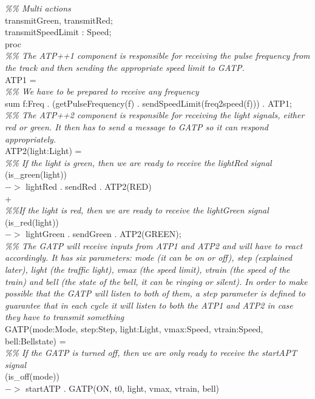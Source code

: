 \documentclass[11pt,a4paper]{article}
\begin{document}
	\textit{\%\% Multi actions}\\
	transmitGreen, transmitRed;\\
	transmitSpeedLimit : Speed;\\


proc\\

	\textit{\%\% The ATP++1 component is responsible for receiving the pulse frequency from the track and then sending the appropriate speed limit to GATP.}\\
	ATP1 = \\
		\textit{\%\% We have to be prepared to receive any frequency}\\
		sum f:Freq . (getPulseFrequency(f) . sendSpeedLimit(freq2speed(f))) . ATP1; \\
	
	 
	\textit{\%\% The ATP++2 component is responsible for receiving the light signals, either red or green. It then has to send a message to GATP so it can respond appropriately.}\\
	ATP2(light:Light) = \\
		\textit{\%\% If the light is green, then we are ready to receive the lightRed signal}\\
		(is\_green(light)) \\
			$->$ lightRed . sendRed . ATP2(RED)\\
		+\\
		\textit{\%\%If the light is red, then we are ready to receive the lightGreen signal}\\
		(is\_red(light))\\
			$->$ lightGreen . sendGreen . ATP2(GREEN);\\
				

	 \textit{\%\% The GATP will receive inputs from ATP1 and ATP2 and will have to react accordingly. It has six parameters: mode (it can be on or off), step (explained later), light (the traffic light), vmax (the speed limit), vtrain (the speed of the train) and bell (the state of the bell, it can be ringing or silent). In order to make possible that the GATP will listen to both of them, a step parameter is defined to guarantee that in each cycle it will listen to both the ATP1 and ATP2 in case they have to transmit something}\\
	
	GATP(mode:Mode, step:Step, light:Light, vmax:Speed, vtrain:Speed, bell:Bellstate) = \\

		\textit{\%\% If the GATP is turned off, then we are only ready to receive the startAPT signal}\\
		(is\_off(mode)) \\
			$->$ startATP . GATP(ON, t0, light, vmax, vtrain, bell)\\
\end{document}
